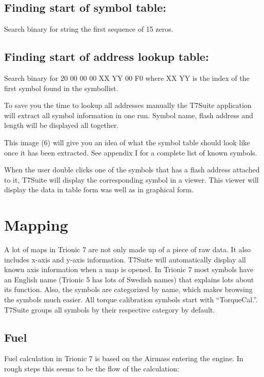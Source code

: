 \documentclass[11pt,a4paper]{book}
\begin{document}
\section{Finding start of symbol table:}

Search binary for string the first sequence of 15 zeros.
\section{Finding start of address lookup table:}
Search binary for 20 00 00 00 XX YY 00 F0 where XX YY is the index of the first
symbol found in the symbollist.

To save you the time to lookup all addresses manually the T7Suite application
will extract all symbol information in one run. Symbol name, flash address and
length will be displayed all together.

This image (6) will give you an idea of what the symbol table should
look like once it has been extracted. See appendix I for a complete
list of known symbols.
\begin{figure}[]
    \centering
    \missingfigure{}
    \caption{}
    \label{fig:}
\end{figure}

When the user double clicks one of the symbols that has a flash address attached
to it, T7Suite will display the corresponding symbol in a viewer. This viewer
will display the data in table form was well as in graphical form.
\begin{figure}[]
    \centering
    \missingfigure{}
    \caption{}
    \label{fig:}
\end{figure}

\chapter{Mapping}
A lot of maps in Trionic 7 are not only made up of a piece of raw data. It also
includes x-axis and y-axis information. T7Suite will automatically display all
known axis information when a map is opened. In Trionic 7 most symbols have an
English name (Trionic 5 has lots of Swedish names) that explains lots about its
function. Also, the symbols are categorized by name, which makes browsing the
symbols much easier. All torque calibration symbols start with
\enquote{TorqueCal.}. T7Suite groups all symbols by their respective category by
default.

\section{Fuel}
Fuel calculation in Trionic 7 is based on the Airmass entering the engine. In
rough steps this seems to be the flow of the calculation:
\end{document}
